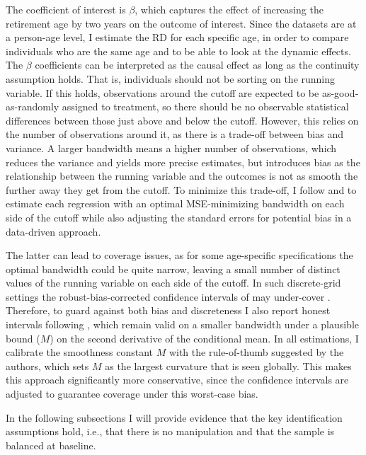 \documentclass[12pt, a4paper]{article}
\begin{document}
The coefficient of interest is $\beta$, which captures the effect of increasing the retirement age by two years on the outcome of interest. Since the datasets are at a person-age level, I estimate the RD for each specific age, in order to compare individuals who are the same age and to be able to look at the dynamic effects. The $\beta$ coefficients can be interpreted as the causal effect as long as the continuity assumption holds. That is, individuals should not be sorting on the running variable. If this holds, observations around the cutoff are expected to be as-good-as-randomly assigned to treatment, so there should be no observable statistical differences between those just above and below the cutoff. However, this relies on the number of observations around it, as there is a trade-off between bias and variance. A larger bandwidth means a higher number of observations, which reduces the variance and yields more precise estimates, but introduces bias as the relationship between the running variable and the outcomes is not as smooth the further away they get from the cutoff. To minimize this trade-off, I follow \citet{calonico2014robust} and \citet{calonico2020optimal} to estimate each regression with an optimal MSE-minimizing bandwidth on each side of the cutoff while also adjusting the standard errors for potential bias in a data-driven approach.

The latter can lead to coverage issues, as for some age-specific specifications the optimal bandwidth could be quite narrow, leaving a small number of distinct values of the running variable on each side of the cutoff. In such discrete-grid settings the robust-bias-corrected confidence intervals of \citet{calonico2014robust} may under-cover \citep{armstrong2018simple}. Therefore, to guard against both bias and discreteness I also report honest intervals following \citet{kolesar2018inference}, which remain valid on a smaller bandwidth under a plausible bound ($M$) on the second derivative of the conditional mean. In all estimations, I calibrate the smoothness constant $M$ with the rule-of-thumb suggested by the authors, which sets $M$ as the largest curvature that is seen globally. This makes this approach significantly more conservative, since the confidence intervals are adjusted to guarantee coverage under this worst-case bias. %

In the following subsections I will provide evidence that the key identification assumptions hold, i.e., that there is no manipulation and that the sample is balanced at baseline.
\end{document}
